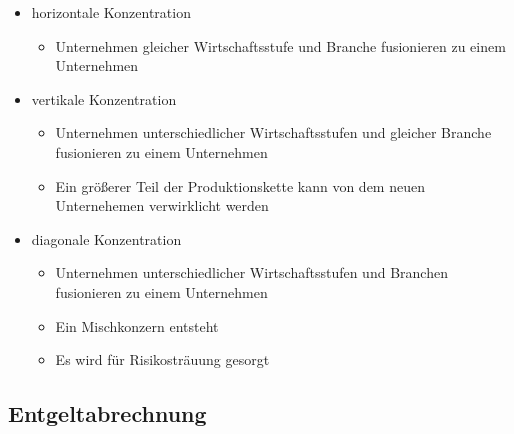 \begin{itemize}
\setlength\itemsep{0em}
	\item horizontale Konzentration
		\begin{itemize}
			\item Unternehmen gleicher Wirtschaftsstufe und Branche fusionieren zu einem Unternehmen
		\end{itemize}
	\item vertikale Konzentration
		\begin{itemize}
			\item Unternehmen unterschiedlicher Wirtschaftsstufen und gleicher Branche fusionieren zu einem Unternehmen
			\item Ein größerer Teil der Produktionskette kann von dem neuen Unternehemen verwirklicht werden
		\end{itemize}
	\item diagonale Konzentration
		\begin{itemize}
			\item Unternehmen unterschiedlicher Wirtschaftsstufen und Branchen fusionieren zu einem Unternehmen
			\item Ein Mischkonzern entsteht
			\item Es wird für Risikosträuung gesorgt
		\end{itemize}
\end{itemize}


\subsection{Entgeltabrechnung}

